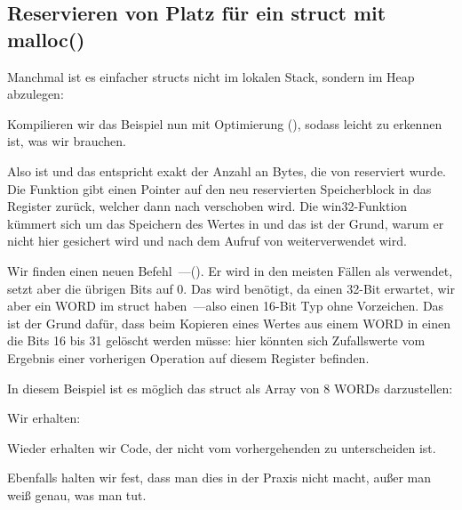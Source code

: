 \subsection{Reservieren von Platz für ein struct mit malloc()}
\label{struct_malloc_example}
Manchmal ist es einfacher structs nicht im lokalen Stack, sondern im Heap abzulegen:


Kompilieren wir das Beispiel nun mit Optimierung (\Ox), sodass leicht zu erkennen ist, was wir brauchen.



Also ist  und das entspricht exakt der Anzahl an Bytes, die von  reserviert
wurde. Die Funktion gibt einen Pointer auf den neu reservierten Speicherblock in das Register \EAX zurück, welcher dann
nach \ESI verschoben wird.
Die win32-Funktion  kümmert sich um das Speichern des Wertes in \ESI und das ist der Grund, warum er
nicht hier gesichert wird und nach dem Aufruf von  weiterverwendet wird.

Wir finden einen neuen Befehl~---\MOVZX ().
Er wird in den meisten Fällen als \MOVSX verwendet, setzt aber die übrigen Bits auf 0.
Das wird benötigt, da \printf einen 32-Bit \Tint erwartet, wir aber ein WORD im struct haben~---also einen 16-Bit Typ
ohne Vorzeichen.
Das ist der Grund dafür, dass beim Kopieren eines Wertes aus einem WORD in einen \Tint die Bits 16 bis 31 gelöscht
werden müsse: hier könnten sich Zufallswerte vom Ergebnis einer vorherigen Operation auf diesem Register befinden.

In diesem Beispiel ist es möglich das struct als Array von 8 WORDs darzustellen:



Wir erhalten:


Wieder erhalten wir Code, der nicht vom vorhergehenden zu unterscheiden ist.

Ebenfalls halten wir fest, dass man dies in der Praxis nicht macht, außer man weiß genau, was man tut.


